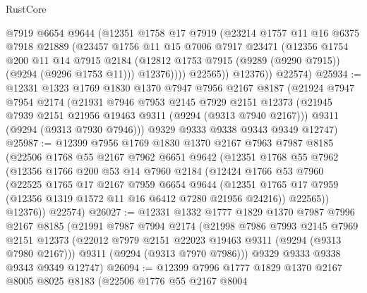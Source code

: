 \begin{lexlean}{RustCore}
\begin{coremodule}
              @7919
              @6654
              @9644
              (@12351
                @1758
                @17
                @7919
                (@23214
                  @1757
                  @11
                  @16
                  @6375
                  @7918
                  @21889
                  (@23457
                    @1756
                    @11
                    @15
                    @7006
                    @7917
                    @23471
                    (@12356
                      @1754
                      @200
                      @11
                      @14
                      @7915
                      @2184
                      (@12812 @1753 @7915 (@9289 (@9290 @7915)) (@9294 (@9296 @1753 @11)))
                      @12376))))
              @22565))
          @12376))
      @22574)
@25934 := @12331
    @1323
    @1769
    @1830
    @1370
    @7947
    @7956
    @2167
    @8187
    (@21924
      @7947
      @7954
      @2174
      (@21931
        @7946
        @7953
        @2145
        @7929
        @2151
        @12373
        (@21945 @7939 @2151 @21956 @19463 @9311 (@9294 (@9313 @7940 @2167)))
        @9311
        (@9294 (@9313 @7930 @7946)))
      @9329
      @9333
      @9338
      @9343
      @9349
      @12747)
@25987 := @12399
    @7956
    @1769
    @1830
    @1370
    @2167
    @7963
    @7987
    @8185
    (@22506
      @1768
      @55
      @2167
      @7962
      @6651
      @9642
      (@12351
        @1768
        @55
        @7962
        (@12356
          @1766
          @200
          @53
          @14
          @7960
          @2184
          (@12424
            @1766
            @53
            @7960
            (@22525
              @1765
              @17
              @2167
              @7959
              @6654
              @9644
              (@12351 @1765 @17 @7959 (@12356 @1319 @1572 @11 @16 @6412 @7280 @21956 @24216))
              @22565))
          @12376))
      @22574)
@26027 := @12331
    @1332
    @1777
    @1829
    @1370
    @7987
    @7996
    @2167
    @8185
    (@21991
      @7987
      @7994
      @2174
      (@21998
        @7986
        @7993
        @2145
        @7969
        @2151
        @12373
        (@22012 @7979 @2151 @22023 @19463 @9311 (@9294 (@9313 @7980 @2167)))
        @9311
        (@9294 (@9313 @7970 @7986)))
      @9329
      @9333
      @9338
      @9343
      @9349
      @12747)
@26094 := @12399
    @7996
    @1777
    @1829
    @1370
    @2167
    @8005
    @8025
    @8183
    (@22506
      @1776
      @55
      @2167
      @8004

\end{coremodule}
\end{lexlean}
